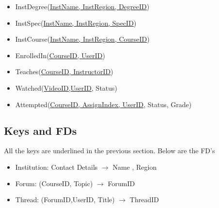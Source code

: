 \documentclass[10pt]{article}
\begin{document}
\begin{itemize}
\item InstDegree(\underline{InstName, InstRegion, DegreeID})
\item InstSpec(\underline{InstName, InstRegion, SpecID})
\item InstCourse(\underline{InstName, InstRegion, CourseID})
\item EnrolledIn(\underline{CourseID, UserID})
\item Teaches(\underline{CourseID, InstructorID})
\item Watched(\underline{VideoID,UserID}, Status)
\item Attempted(\underline{CourseID, AssignIndex, UserID}, Status, Grade)
\end{itemize}

\subsection{Keys and FDs}
All the keys are underlined in the previous section. Below are the FD's
\begin{itemize}
\item Institution: Contact Details $\rightarrow$ Name , Region
\item Forum: (CourseID, Topic) $\rightarrow$ ForumID
\item Thread: (ForumID,UserID, Title) $\rightarrow$ ThreadID
\end{itemize}

\end{document}
